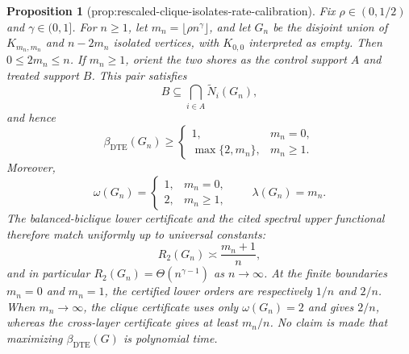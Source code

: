 \documentclass{article}
\newtheorem{proposition}{Proposition}
\begin{document}
\begin{proposition}[prop:rescaled-clique-isolates-rate-calibration]\label{prop:rescaled-clique-isolates-rate-calibration}
Fix \(\rho\in(0,1/2)\) and \(\gamma\in(0,1]\).  For \(n\geq1\), let \(m_n=\lfloor\rho n^{\gamma}\rfloor\), and let \(G_n\) be the disjoint union of \(K_{m_n,m_n}\) and \(n-2m_n\) isolated vertices, with \(K_{0,0}\) interpreted as empty.  Then \(0\leq2m_n\leq n\).  If \(m_n\geq1\), orient the two shores as the control support \(A\) and treated support \(B\).  This pair satisfies
\[
B\subseteq\bigcap_{i\in A}\widetilde N_i(G_n),
\]
and hence
\[
\beta_{\mathrm{DTE}}(G_n)\geq
\begin{cases}
1,&m_n=0,\\
\max\{2,m_n\},&m_n\geq1.
\end{cases}
\]
Moreover,
\[
\omega(G_n)=
\begin{cases}
1,&m_n=0,\\
2,&m_n\geq1,
\end{cases}
\qquad
\lambda(G_n)=m_n.
\]
The balanced-biclique lower certificate and the cited spectral upper functional therefore match uniformly up to universal constants:
\[
R_2(G_n)\asymp\frac{m_n+1}{n},
\]
and in particular \(R_2(G_n)=\Theta(n^{\gamma-1})\) as \(n\to\infty\).  At the finite boundaries \(m_n=0\) and \(m_n=1\), the certified lower orders are respectively \(1/n\) and \(2/n\).  When \(m_n\to\infty\), the clique certificate uses only \(\omega(G_n)=2\) and gives \(2/n\), whereas the cross-layer certificate gives at least \(m_n/n\).  No claim is made that maximizing \(\beta_{\mathrm{DTE}}(G)\) is polynomial time.
\end{proposition}
\end{document}
